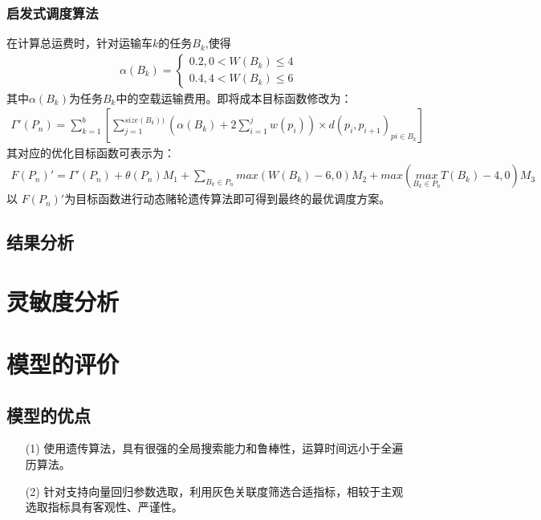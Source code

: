 \documentclass{whutmod}
\begin{document}
     \subsubsection{启发式调度算法}
    在计算总运费时，针对运输车$k$的任务$B_k$,使得
    \begin{gather}
    \alpha (B_k)=\left\{\begin{matrix}0.2,0<W(B_k)\leqslant4
    \\ 0.4,4<W(B_k)\leqslant6
    \end{matrix}\right.
    \end{gather}
    其中$\alpha (B_k)$为任务$B_k$中的空载运输费用。即将成本目标函数修改为：
    \begin{gather}
    \Gamma '(P_n)=\sum _{k=1}^b[\sum _{j=1}^{size(B_k))}(\alpha (B_k)+2\sum _{i=1}^jw(p_i))\times d(p_i,p_{i+1})_{pi\in B_k}]
    \end{gather}
    其对应的优化目标函数可表示为：
      \begin{gather}
    F(P_n)'= \Gamma '(P_n)+\theta(P_n)M_1+\sum_{B_k\in P_n}max( W (B_k)-6 ,0) M_2+max(\underset{B_k\in P_n}{max}T (B_k)-4,0)M_3
    \end{gather}
    以  $F(P_n)'$为目标函数进行动态赌轮遗传算法即可得到最终的最优调度方案。

       \subsection{结果分析}

  \section{灵敏度分析}
  
  
  
  \section{模型的评价}
  \subsection{模型的优点}
  \begin{itemize}                                             
  	\item [(1)] 使用遗传算法，具有很强的全局搜索能力和鲁棒性，运算时间远小于全遍历算法。
  	
  	\item [(2)] 针对支持向量回归参数选取，利用灰色关联度筛选合适指标，相较于主观选取指标具有客观性、严谨性。	
  \end{itemize}
\end{document}
